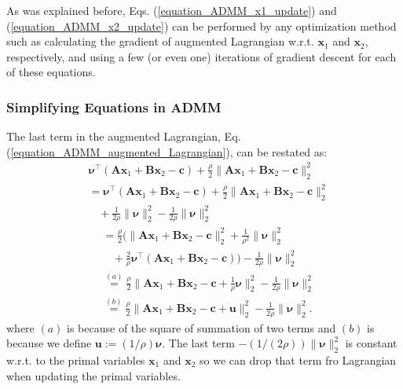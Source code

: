 \documentclass[lang=cn,10pt]{gorgeousnbook}
\numberwithin{equation}{section}%
\numberwithin{figure}{section}%
\begin{document}
As was explained before, Eqs. (\ref{equation_ADMM_x1_update}) and (\ref{equation_ADMM_x2_update}) can be performed by any optimization method such as calculating the gradient of augmented Lagrangian w.r.t. $\boldsymbol{x}_1$ and $\boldsymbol{x}_2$, respectively, and using a few (or even one) iterations of gradient descent for each of these equations. 

\subsubsection{Simplifying Equations in ADMM}

The last term in the augmented Lagrangian, Eq. (\ref{equation_ADMM_augmented_Lagrangian}), can be restated as:
\begin{align*}
&\boldsymbol{\nu}^\top (\boldsymbol{A} \boldsymbol{x}_1 + \boldsymbol{B} \boldsymbol{x}_2 - \boldsymbol{c}) + \frac{\rho}{2} \|\boldsymbol{A} \boldsymbol{x}_1 + \boldsymbol{B} \boldsymbol{x}_2 - \boldsymbol{c}\|_2^2 \\
&= \boldsymbol{\nu}^\top (\boldsymbol{A} \boldsymbol{x}_1 + \boldsymbol{B} \boldsymbol{x}_2 - \boldsymbol{c}) + \frac{\rho}{2} \|\boldsymbol{A} \boldsymbol{x}_1 + \boldsymbol{B} \boldsymbol{x}_2 - \boldsymbol{c}\|_2^2 \\
&~~~~ + \frac{1}{2\rho} \|\boldsymbol{\nu}\|_2^2 - \frac{1}{2\rho} \|\boldsymbol{\nu}\|_2^2 
\end{align*}
\begin{align*}
&= \frac{\rho}{2} \Big(\|\boldsymbol{A} \boldsymbol{x}_1 + \boldsymbol{B} \boldsymbol{x}_2 - \boldsymbol{c}\|_2^2 + \frac{1}{\rho^2} \|\boldsymbol{\nu}\|_2^2 \\
&~~~~ + \frac{2}{\rho} \boldsymbol{\nu}^\top (\boldsymbol{A} \boldsymbol{x}_1 + \boldsymbol{B} \boldsymbol{x}_2 - \boldsymbol{c}) \Big) - \frac{1}{2\rho} \|\boldsymbol{\nu}\|_2^2 \\
&\overset{(a)}{=} \frac{\rho}{2} \big\|\boldsymbol{A} \boldsymbol{x}_1 + \boldsymbol{B} \boldsymbol{x}_2 - \boldsymbol{c} + \frac{1}{\rho} \boldsymbol{\nu}\big\|_2^2 - \frac{1}{2\rho} \|\boldsymbol{\nu}\|_2^2 \\
&\overset{(b)}{=} \frac{\rho}{2} \big\|\boldsymbol{A} \boldsymbol{x}_1 + \boldsymbol{B} \boldsymbol{x}_2 - \boldsymbol{c} + \boldsymbol{u}\big\|_2^2 - \frac{1}{2\rho} \|\boldsymbol{\nu}\|_2^2.
\end{align*}
where $(a)$ is because of the square of summation of two terms and $(b)$ is because we define $\boldsymbol{u} := (1/\rho) \boldsymbol{\nu}$. 
The last term $- (1/(2\rho)) \|\boldsymbol{\nu}\|_2^2$ is constant w.r.t. to the primal variables $\boldsymbol{x}_1$ and $\boldsymbol{x}_2$ so we can drop that term fro Lagrangian when updating the primal variables. 
\end{document}
